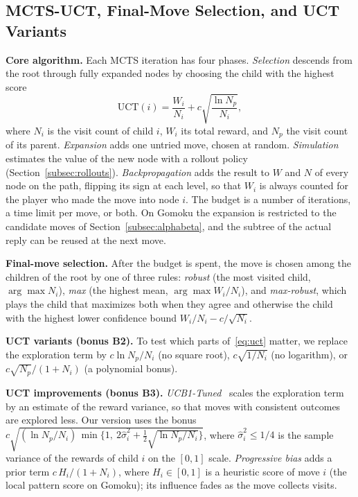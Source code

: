 \subsection{MCTS-UCT, Final-Move Selection, and UCT Variants}
\label{subsec:mcts}

\textbf{Core algorithm.} Each MCTS iteration has four phases. \emph{Selection} descends from the root through fully expanded nodes by choosing the child with the highest score
\begin{equation}
\mathrm{UCT}(i) = \frac{W_i}{N_i} + c\sqrt{\frac{\ln N_p}{N_i}},
\label{eq:uct}
\end{equation}
where $N_i$ is the visit count of child $i$, $W_i$ its total reward, and $N_p$ the visit count of its parent. \emph{Expansion} adds one untried move, chosen at random. \emph{Simulation} estimates the value of the new node with a rollout policy (Section~\ref{subsec:rollouts}). \emph{Backpropagation} adds the result to $W$ and $N$ of every node on the path, flipping its sign at each level, so that $W_i$ is always counted for the player who made the move into node $i$. The budget is a number of iterations, a time limit per move, or both. On Gomoku the expansion is restricted to the candidate moves of Section~\ref{subsec:alphabeta}, and the subtree of the actual reply can be reused at the next move.

\textbf{Final-move selection.} After the budget is spent, the move is chosen among the children of the root by one of three rules: \emph{robust} (the most visited child, $\arg\max N_i$), \emph{max} (the highest mean, $\arg\max W_i/N_i$), and \emph{max-robust}, which plays the child that maximizes both when they agree and otherwise the child with the highest lower confidence bound $W_i/N_i - c/\sqrt{N_i}$.

\textbf{UCT variants (bonus B2).} To test which parts of~\eqref{eq:uct} matter, we replace the exploration term by $c\ln N_p/N_i$ (no square root), $c\sqrt{1/N_i}$ (no logarithm), or $c\sqrt{N_p}/(1+N_i)$ (a polynomial bonus).

\textbf{UCT improvements (bonus B3).} \emph{UCB1-Tuned}~\cite{auer2002finite} scales the exploration term by an estimate of the reward variance, so that moves with consistent outcomes are explored less. Our version uses the bonus $c\sqrt{(\ln N_p/N_i)\,\min\{1,\ 2\hat\sigma_i^2 + \tfrac{1}{2}\sqrt{\ln N_p/N_i}\}}$, where $\hat\sigma_i^2 \le 1/4$ is the sample variance of the rewards of child $i$ on the $[0,1]$ scale. \emph{Progressive bias} adds a prior term $c\,H_i/(1+N_i)$, where $H_i \in [0,1]$ is a heuristic score of move $i$ (the local pattern score on Gomoku); its influence fades as the move collects visits.

